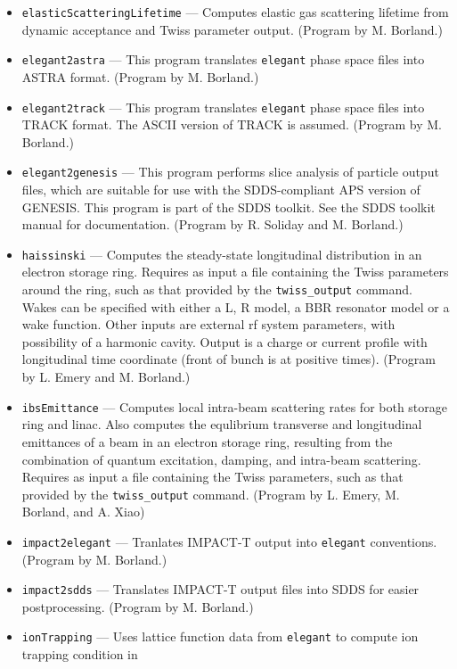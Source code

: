 \documentclass[11pt]{article}
\begin{document}
\begin{itemize}
\item {\tt elasticScatteringLifetime} --- Computes elastic gas scattering lifetime from dynamic acceptance and Twiss parameter output.
  (Program by M. Borland.)
\item {\tt elegant2astra} --- This program translates {\tt elegant} phase space files into ASTRA \cite{ASTRA} format.
  (Program by M. Borland.)
\item {\tt elegant2track} --- This program translates {\tt elegant} phase space files into TRACK \cite{TRACK} format.
  The ASCII version of TRACK is assumed.
  (Program by M. Borland.)
\item {\tt elegant2genesis} --- This program performs
        slice analysis of particle output files, which are suitable for use with
        the SDDS-compliant APS version of GENESIS\cite{GENESIS}.  This program is
        part of the SDDS toolkit.  See the SDDS toolkit
        manual for documentation. (Program by R. Soliday and M. Borland.)
\item {\tt haissinski} --- Computes the steady-state longitudinal distribution in
        an electron storage ring.  Requires as input a file containing the Twiss
        parameters around the ring, such as that provided by the \verb|twiss_output| command.
        Wakes can be specified with either a L, R model, a BBR resonator model or a wake function.
        Other inputs are external rf system parameters, with possibility of a harmonic
        cavity. Output is a charge or current profile with longitudinal time coordinate (front
        of bunch is at positive times). 
        (Program by L. Emery and M. Borland.)
\item {\tt ibsEmittance} --- Computes local intra-beam scattering rates for both storage ring
        and linac. Also computes the equlibrium transverse and longitudinal emittances of a 
        beam in an electron storage ring, resulting from the combination of quantum excitation,
        damping, and intra-beam scattering.  Requires as input a file containing the
        Twiss parameters, such as that provided by the \verb|twiss_output| command.
        (Program by L. Emery, M. Borland, and A. Xiao)
\item {\tt impact2elegant} --- Tranlates IMPACT-T \cite{IMPACT} output into {\tt elegant} conventions.
  (Program by M. Borland.)
\item {\tt impact2sdds} --- Translates IMPACT-T output files into SDDS for easier postprocessing.
  (Program by M. Borland.)
\item {\tt ionTrapping} --- Uses lattice function data from {\tt elegant} to compute ion trapping condition in

\end{itemize}
\end{document}
